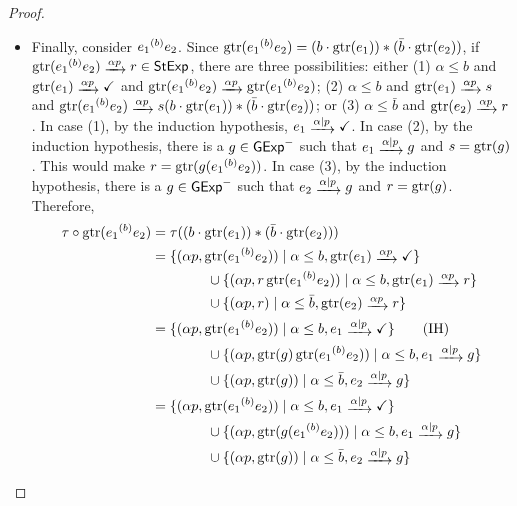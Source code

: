 \documentclass[orivec,envcountsect,envcountsame]{llncs}
\begin{document}
\begin{proof}
\begin{itemize}
		\item Finally, consider \(e_1{\mathbin{^{(b)}}}e_2\).
		Since \(\operatorname{gtr}(e_1{\mathbin{^{(b)}}}e_2) = (b\cdot \operatorname{gtr}(e_1))*(\bar b \cdot \operatorname{gtr}(e_2))\), if \(\gtr(e_1\while{b}e_2) \tr{\alpha p} r \in \SExp\), there are three possibilities: either (1) \(\alpha \le b\) and \(\gtr(e_1) \tr{\alpha p} \checkmark\) and \(\gtr(e_1\while{b}e_2)\tr{\alpha p} \gtr(e_1\while{b}e_2)\); (2) \(\alpha \le b\) and \(\gtr(e_1) \tr{\alpha p} s\) and \(\gtr(e_1\while{b}e_2) \tr{\alpha p} s(b \cdot \gtr(e_1))*(\bar b \cdot \gtr(e_2))\); or (3) \(\alpha \le \bar b\) and \(\gtr(e_2) \tr{\alpha p} r\).
		In case (1), by the induction hypothesis, \(e_1 \tr{\alpha \mid p} \checkmark\).
		In case (2), by the induction hypothesis, there is a \(g \in \mathsf{GExp}^-\) such that \(e_1 \tr{\alpha \mid p} g\) and \(s = \operatorname{gtr}(g)\).
		This would make \(r = \operatorname{gtr}(g(e_1{\mathbin{^{(b)}}}e_2))\).
		In case (3), by the induction hypothesis, there is a \(g \in \mathsf{GExp}^-\) such that \(e_2 \tr{\alpha \mid p} g\) and \(r = \operatorname{gtr}(g)\).
		Therefore,
		\begin{align*}
			\tau \circ \gtr(e_1\while{b}e_2)
			&= \tau((b \cdot \gtr(e_1))*(\bar b \cdot \gtr(e_2))) \\
			&= \{(\alpha p, \gtr(e_1 \while b e_2)) \mid \alpha\le b, \gtr(e_1) \tr{\alpha p} \checkmark\} \\
			&\hspace*{4em}\cup \{(\alpha p, r\gtr(e_1 \while b e_2)) \mid \alpha\le b, \gtr(e_1) \tr{\alpha p} r\} \\
			&\hspace*{4em}\cup \{(\alpha p, r) \mid \alpha\le \bar b, \gtr(e_2) \tr{\alpha p} r\} \\
			&= \{(\alpha p, \gtr(e_1 \while b e_2)) \mid \alpha\le b, e_1 \tr{\alpha \mid p} \checkmark\}\tag{IH} \\
			&\hspace*{4em}\cup \{(\alpha p, \gtr(g)\gtr(e_1 \while b e_2)) \mid \alpha\le b, e_1 \tr{\alpha \mid p} g\} \\
			&\hspace*{4em}\cup \{(\alpha p, \gtr(g)) \mid \alpha\le \bar b, e_2 \tr{\alpha \mid p} g\} \\
			&= \{(\alpha p, \gtr(e_1 \while b e_2)) \mid \alpha\le b, e_1 \tr{\alpha \mid p} \checkmark\} \\
			&\hspace*{4em}\cup \{(\alpha p, \gtr(g(e_1 \while b e_2))) \mid \alpha\le b, e_1 \tr{\alpha \mid p} g\} \\
			&\hspace*{4em}\cup \{(\alpha p, \gtr(g)) \mid \alpha\le \bar b, e_2 \tr{\alpha \mid p} g\} \\

\end{align*}
\end{itemize}
\end{proof}
\end{document}
